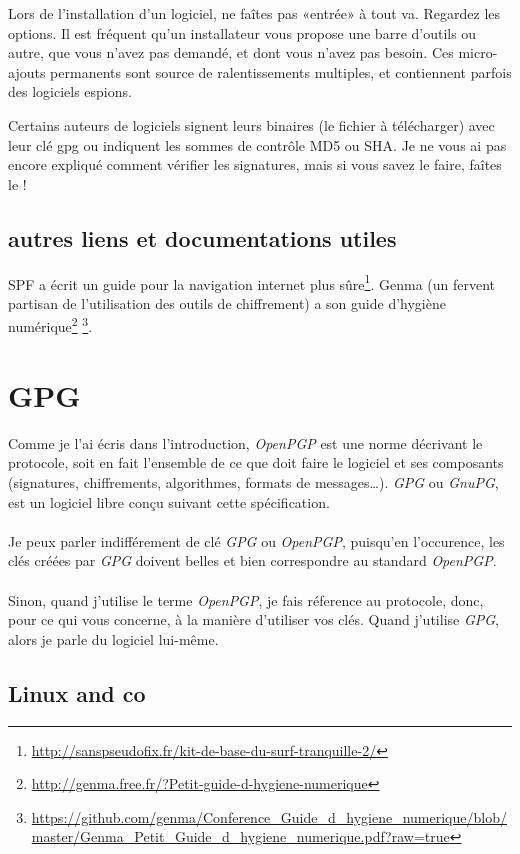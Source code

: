 Lors de l'installation d'un logiciel, ne faîtes pas «entrée» à tout va.
Regardez les options. Il est fréquent qu'un installateur vous propose
une barre d'outils ou autre, que vous n'avez pas demandé, et dont vous
n'avez pas besoin. Ces micro-ajouts permanents sont source de
ralentissements multiples, et contiennent parfois des logiciels espions.

Certains auteurs de logiciels signent leurs binaires (le fichier à
télécharger) avec leur clé gpg ou indiquent les sommes de contrôle MD5
ou SHA. Je ne vous ai pas encore expliqué comment vérifier les
signatures, mais si vous savez le faire, faîtes le !

\subsection{autres liens et documentations utiles}

SPF a écrit un guide pour la navigation internet plus sûre\footnote{\url{http://sanspseudofix.fr/kit-de-base-du-surf-tranquille-2/}}.
Genma (un fervent partisan de l'utilisation des outils de chiffrement) a son guide d'hygiène numérique\footnote{\url{http://genma.free.fr/?Petit-guide-d-hygiene-numerique}} \footnote{\url{https://github.com/genma/Conference_Guide_d_hygiene_numerique/blob/master/Genma_Petit_Guide_d_hygiene_numerique.pdf?raw=true}}.

\section{GPG}\label{gpg}

Comme je l'ai écris dans l'introduction, \emph{OpenPGP} est une norme décrivant le protocole, soit en fait l'ensemble de ce que doit faire le logiciel et ses composants (signatures, chiffrements, algorithmes, formats de messages…). \emph{GPG} ou \emph{GnuPG}, est un logiciel libre conçu suivant cette spécification.\\
\\
Je peux parler indifférement de clé \emph{GPG} ou \emph{OpenPGP}, puisqu'en l'occurence, les clés créées par \emph{GPG} doivent belles et bien correspondre au standard \emph{OpenPGP}.\\
\\
Sinon, quand j'utilise le terme \emph{OpenPGP}, je fais réference au protocole, donc, pour ce qui vous concerne, à la manière d'utiliser vos clés. Quand j'utilise \emph{GPG}, alors je parle du logiciel lui-même.

\subsection{Linux and co}\label{linux-and-co}


